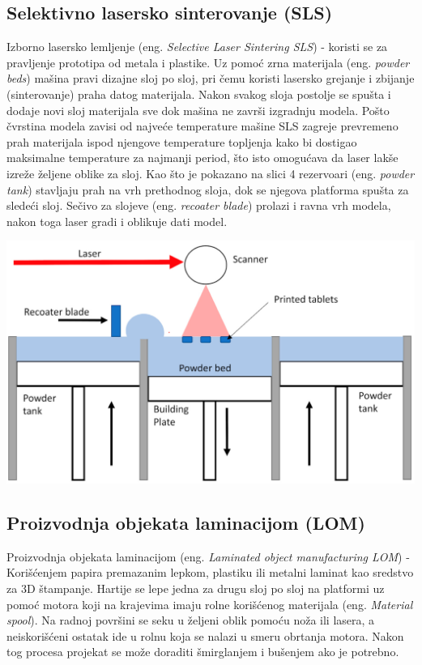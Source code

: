 \documentclass[a4paper]{article}
\begin{document}
\subsection{Selektivno lasersko sinterovanje (SLS)\cite{e}}
\label{subsec:podnaslov4}
Izborno lasersko lemljenje (eng. \emph{Selective Laser Sintering SLS}) - koristi se za pravljenje prototipa od metala i plastike. Uz pomoć zrna materijala (eng. \emph{powder beds}) mašina pravi dizajne sloj po sloj, pri čemu koristi lasersko grejanje i zbijanje (sinterovanje) praha datog materijala. 
\bigbreak Nakon svakog sloja postolje se spušta i dodaje novi sloj materijala sve dok mašina ne završi izgradnju modela. Pošto čvrstina modela zavisi od najveće temperature mašine SLS zagreje prevremeno prah materijala ispod njengove temperature topljenja kako bi dostigao maksimalne temperature za najmanji period, što isto omogućava da laser lakše izreže željene oblike za sloj. 
\bigbreak Kao što je pokazano na slici 4 rezervoari (eng. \emph{powder tank}) stavljaju prah na vrh prethodnog sloja, dok se njegova platforma spušta za sledeći sloj.
\bigbreak Sečivo za slojeve (eng. \emph{recoater blade}) prolazi i ravna vrh modela, nakon toga laser gradi i oblikuje dati model. 
\begin{center}
\includegraphics[width=.5\textwidth ]{Tehnikeslike/Sls.png}
\end{center}
\newpage
\subsection{Proizvodnja objekata laminacijom (LOM)\cite{lom}}
\label{subsec:podnaslov5}
Proizvodnja objekata laminacijom (eng. \emph{ Laminated object manufacturing LOM}) - Korišćenjem papira premazanim lepkom, plastiku ili metalni laminat kao sredstvo za 3D štampanje. 
\bigbreak Hartije se lepe jedna za drugu sloj po sloj na platformi uz pomoć motora koji na krajevima imaju rolne korišćenog materijala (eng. \emph{Material spool}).
\bigbreak Na radnoj površini se seku u željeni oblik pomoću noža ili lasera, a neiskorišćeni ostatak ide u rolnu koja se nalazi u smeru obrtanja motora.
\bigbreak Nakon tog procesa projekat se može doraditi šmirglanjem i bušenjem ako je potrebno.
\end{document}

